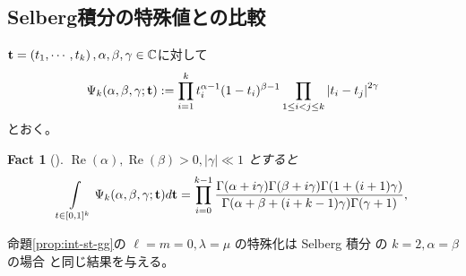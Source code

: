 \documentclass[12pt,a4paper,dvipdfmx]{jsarticle}
\numberwithin{equation}{section}
\newcommand{\tmop}[1]{\ensuremath{\operatorname{#1}}}
\newcommand{\assign}{:=}
\theoremstyle{jplain}
\newtheorem{fact}[thm]{Fact}
\theoremstyle{remark}
\theoremstyle{definition}
\begin{document}
\subsection{Selberg積分の特殊値との比較}
\newcommand{\boldt}{\mathbf{t}}
$\boldt=\left( t_1,\cdots,t_k \right),\alpha,\beta,\gamma\in\C$に対して\begin{equation*}
	\Psi_k(\alpha,\beta,\gamma;\mathbf{t})\assign
\displaystyle\prod\displaylimits_{i=1}^k t_i^{\alpha-1}(1-t_i)^{\beta-1} 
		\displaystyle\prod\displaylimits_{1\le i<j\le k}\myabs{t_i-t_j}^{2\gamma}
\end{equation*}とおく。
		\normalfont
		\begin{fact}[{\cite[セルバーグ積分]{Selberg:411367}}]
				$\tmop{Re} (\alpha), \tmop{Re} (\beta) > 0, | \gamma | \ll 1$
				とすると
	 \begin{equation*}
		 \normalfont
		\begin{array}[]{c}
		\displaystyle\int_{t \in [0, 1]^k}  \Psi_k(\alpha,\beta,\gamma;\boldt)d\boldt=
		\displaystyle\prod_{i = 0}^{k - 1} \frac{\Gamma (\alpha + i \gamma) \Gamma (\beta + i
				\gamma) \Gamma (1 + (i + 1) \gamma)}{\Gamma (\alpha + \beta + (i + k - 1)
				\gamma) \Gamma (\gamma + 1)},
		\end{array}
			\end{equation*}
		\end{fact}
		命題\ref{prop:int-st-gg}の $\ell = m = 0,\lambda=\mu$ の特殊化は
		Selberg 積分
の $k = 2,\alpha=\beta$ の場合
と同じ結果を与える。
\\
			\begin{samepage}
				\vspace{1em}
		\centerline{
		\xymatrixcolsep{1.9cm}
		}
		\nopagebreak
				\vspace{1em}
			\end{samepage}
\end{document}

